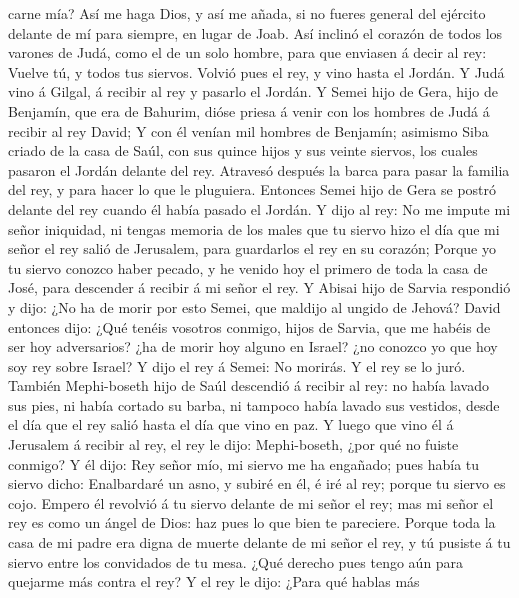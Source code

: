 carne mía? Así me haga Dios, y así me añada, si no fueres general del
ejército delante de mí para siempre, en lugar de Joab. 
Así inclinó el corazón de todos los varones de Judá, como el de un solo
hombre, para que enviasen á decir al rey: Vuelve tú, y todos tus
siervos.  Volvió pues el rey, y vino hasta el Jordán. Y
Judá vino á Gilgal, á recibir al rey y pasarlo el Jordán.
 Y Semei hijo de Gera, hijo de Benjamín, que era de
Bahurim, dióse priesa á venir con los hombres de Judá á recibir al rey
David;  Y con él venían mil hombres de Benjamín; asimismo
Siba criado de la casa de Saúl, con sus quince hijos y sus veinte
siervos, los cuales pasaron el Jordán delante del rey. 
Atravesó después la barca para pasar la familia del rey, y para hacer lo
que le pluguiera. Entonces Semei hijo de Gera se postró delante del rey
cuando él había pasado el Jordán.  Y dijo al rey: No me
impute mi señor iniquidad, ni tengas memoria de los males que tu siervo
hizo el día que mi señor el rey salió de Jerusalem, para guardarlos el
rey en su corazón;  Porque yo tu siervo conozco haber
pecado, y he venido hoy el primero de toda la casa de José, para
descender á recibir á mi señor el rey.  Y Abisai hijo de
Sarvia respondió y dijo: ¿No ha de morir por esto Semei, que maldijo al
ungido de Jehová?  David entonces dijo: ¿Qué tenéis
vosotros conmigo, hijos de Sarvia, que me habéis de ser hoy adversarios?
¿ha de morir hoy alguno en Israel? ¿no conozco yo que hoy soy rey sobre
Israel?  Y dijo el rey á Semei: No morirás. Y el rey se
lo juró.  También Mephi-boseth hijo de Saúl descendió á
recibir al rey: no había lavado sus pies, ni había cortado su barba, ni
tampoco había lavado sus vestidos, desde el día que el rey salió hasta
el día que vino en paz.  Y luego que vino él á Jerusalem
á recibir al rey, el rey le dijo: Mephi-boseth, ¿por qué no fuiste
conmigo?  Y él dijo: Rey señor mío, mi siervo me ha
engañado; pues había tu siervo dicho: Enalbardaré un asno, y subiré en
él, é iré al rey; porque tu siervo es cojo.  Empero él
revolvió á tu siervo delante de mi señor el rey; mas mi señor el rey es
como un ángel de Dios: haz pues lo que bien te pareciere.
 Porque toda la casa de mi padre era digna de muerte
delante de mi señor el rey, y tú pusiste á tu siervo entre los
convidados de tu mesa. ¿Qué derecho pues tengo aún para quejarme más
contra el rey?  Y el rey le dijo: ¿Para qué hablas más
